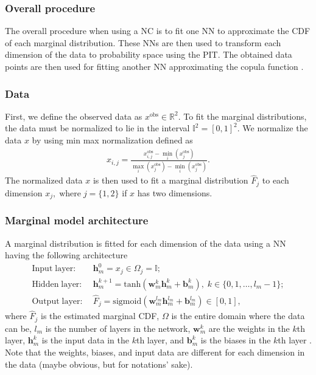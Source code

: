 \subsubsection{Overall procedure}
The overall procedure when using a \gls{NC} is to fit one \gls{NN} to approximate the \gls{CDF} of each marginal distribution. These \gls{NN}s are then used to transform each dimension of the data to probability space using the \gls{PIT}. The obtained data points are then used for fitting another \gls{NN} approximating the copula function . 

\subsubsection{Data}
First, we define the observed data as $x^{\mathrm{obs}}\in \mathbb{R}^2 $. To fit the marginal distributions, the data must be normalized to lie in the interval $\mathbb{I}^2 = [0,1]^2$. We normalize the data $x$ by using min max normalization defined as
\begin{align*}
    x_{i,j} = \frac{x_{i,j}^{\mathrm{obs}} - \min_i(x_{j}^{\mathrm{obs}})}{  \max_i(x_{j}^{\mathrm{obs}})- \min_i(x_{j}^{\mathrm{obs}})}.
\end{align*}
The normalized data $x$ is then used to fit a marginal distribution $\hat{F}_j$ to each dimension $x_j, \; \mathrm{where} \; j=\{1,2\}$ if $x$ has two dimensions. 


\subsubsection{Marginal model architecture}
A marginal distribution is fitted for each dimension of the data using a \gls{NN} having the following architecture 
\begin{align*}
    \mathrm{Input\;layer:} \; & \mathbf{h}_m^0 = x_j \in \Omega_j = \mathbb{I}; \\
    \mathrm{Hidden\;layer:} \; & \mathbf{h}_m^{k+1} = \mathrm{tanh}(\mathbf{w}_m^{k} \mathbf{h}_m^{k} + \mathbf{b}_m^{k}), \; k \in \{0,1, \dots, l_m -1 \};\\
    \mathrm{Output\;layer:} \; & \hat{F}_j = \mathrm{sigmoid}(\mathbf{w}_m^{l_m} \mathbf{h}_m^{l_m} + \mathbf{b}_m^{l_m}) \in \left[0,1 \right],
\end{align*}
where $\hat{F}_j$ is the estimated marginal \gls{CDF}, $\Omega$ is the entire domain where the data can be, $l_m$ is the number of layers in the network, $\mathbf{w}_m^{k}$ are the weights in the $k$th layer,  $\mathbf{h}_m^{k}$ is the input data in the $k$th layer, and $\mathbf{b}_m^{k}$ is the biases in the $k$th layer . Note that the weights, biases, and input data are different for each dimension in the data (maybe obvious, but for notations' sake). 

